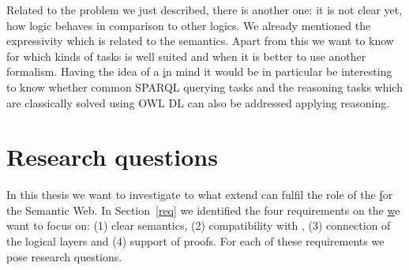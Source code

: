 Related to the problem we just described, there is another one: it is not clear yet, how \nthree logic behaves in comparison to other logics. 
We already mentioned the expressivity which is related to the semantics. 
Apart from this we want to know for which kinds of tasks \nthreelogic is well suited 
and when it is better to use another formalism. Having the idea of a \ul in mind it would be in particular be interesting to 
know whether common SPARQL querying tasks 
and the reasoning tasks which are classically solved using OWL DL can also be addressed applying \nthree reasoning.

%
% 
% 
% 
% 
% 
% 
% 
%  

\section{Research questions}\label{researchquestions}
In this thesis we want to investigate to what extend \nthreelogic can fulfil the role of the \ul for the Semantic Web.
In Section~\ref{req} we identified the four requirements on the \ul we want to focus on: (1) clear semantics, %
(2) compatibility with \rdf, 
(3) connection of the logical layers 
and (4) support of proofs. For each of these requirements we pose research questions.



